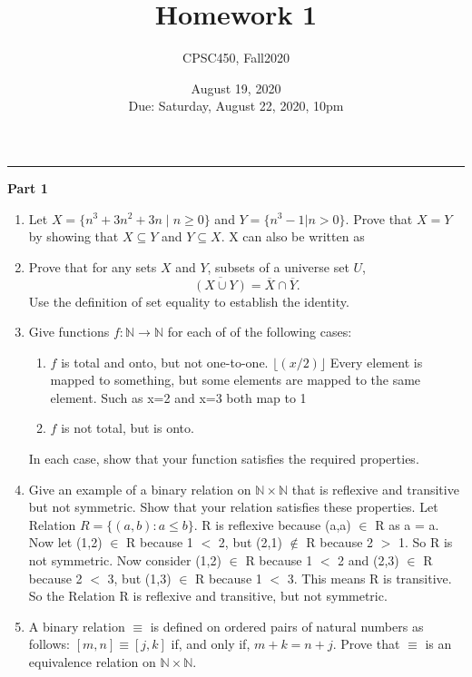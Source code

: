 \documentclass{article}
\title{Homework 1}
\author{CPSC450, Fall2020}
\date{August 19, 2020\\
Due: Saturday, August 22, 2020, 10pm}
\newcommand{\nat}{\mathbb{N}}
\begin{document}
\maketitle %

\medskip
\hrule
\medskip

\centerline{\textbf{Part 1}}

\begin{enumerate}
\item Let $X = \{n^3 + 3n^2 + 3n \mid n \geq 0\}$ and $Y = \{n^3 - 1 |
  n > 0\}$.  Prove that $X = Y$ by showing that $X \subseteq Y$ and $Y
  \subseteq X$.
  \newline X can also be written as 

\item Prove that for any sets $X$ and $Y$, subsets of a universe set
  $U$, 
\[
\overline{(X \cup Y)} = \overline{X}\cap\overline{Y}.
\]
Use the definition of set equality to establish the identity.
\newline 

\item Give functions $f: \nat \to \nat$ for each of of the following
  cases:
  \begin{enumerate}
  \item $f$ is total and onto, but not one-to-one.
  \newline $\lfloor (x/2) \rfloor$ Every element is mapped to something, but some elements are mapped to the same element. Such as x=2 and x=3 both map to 1
  \item $f$ is not total, but is onto.
  \newline 
  \end{enumerate}
  In each case, show that your function satisfies the required properties.

\item Give an example of a binary relation on $\nat \times \nat$ that
  is reflexive and transitive but not symmetric. Show that your
  relation satisfies these properties.
  \newline
  \newline Let Relation $R = \{(a,b): a \leq b\}$. R is reflexive because (a,a) $\in$ R as a = a.
  Now let (1,2) $\in$ R because 1 $<$ 2, but (2,1) $\notin$ R because 2 $>$ 1. So R is not symmetric.
  \newline Now consider (1,2) $\in$ R because 1 $<$ 2 and (2,3) $\in$ R because 2 $<$ 3, but (1,3) $\in$ R because 1 $<$ 3. This means R is transitive. So the Relation R is reflexive and transitive, but not symmetric.

\item A binary relation $\equiv$ is defined on ordered pairs of
  natural numbers as follows: $[m, n] \equiv [j, k]$ if, and only if,
  $m+k = n+j$. Prove that $\equiv$ is an equivalence relation on $\nat
  \times \nat$.
  
\end{enumerate}
\end{document}
